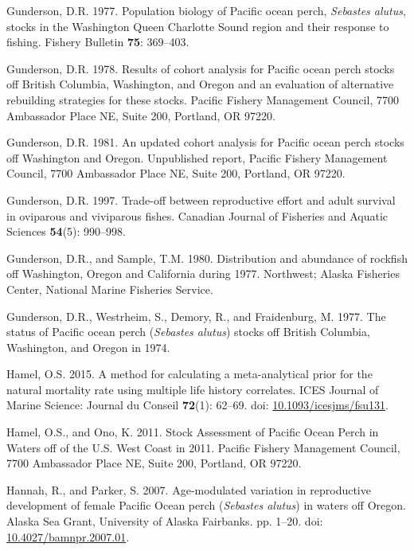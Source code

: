 \documentclass[12pt,]{article}
\begin{document}
\hypertarget{ref-gunderson_population_1977}{}
Gunderson, D.R. 1977. Population biology of Pacific ocean perch,
\emph{Sebastes alutus}, stocks in the Washington Queen Charlotte Sound
region and their response to fishing. Fishery Bulletin \textbf{75}:
369--403.

\hypertarget{ref-gunderson_results_1978}{}
Gunderson, D.R. 1978. Results of cohort analysis for Pacific ocean perch
stocks off British Columbia, Washington, and Oregon and an evaluation of
alternative rebuilding strategies for these stocks. Pacific Fishery
Management Council, 7700 Ambassador Place NE, Suite 200, Portland, OR
97220.

\hypertarget{ref-gunderson_updated_1981}{}
Gunderson, D.R. 1981. An updated cohort analysis for Pacific ocean perch
stocks off Washington and Oregon. Unpublished report, Pacific Fishery
Management Council, 7700 Ambassador Place NE, Suite 200, Portland, OR
97220.

\hypertarget{ref-gunderson_trade-off_1997}{}
Gunderson, D.R. 1997. Trade-off between reproductive effort and adult
survival in oviparous and viviparous fishes. Canadian Journal of
Fisheries and Aquatic Sciences \textbf{54}(5): 990--998.

\hypertarget{ref-gunderson_distribution_1980}{}
Gunderson, D.R., and Sample, T.M. 1980. Distribution and abundance of
rockfish off Washington, Oregon and California during 1977. Northwest;
Alaska Fisheries Center, National Marine Fisheries Service.

\hypertarget{ref-gunderson_status_1977}{}
Gunderson, D.R., Westrheim, S., Demory, R., and Fraidenburg, M. 1977.
The status of Pacific ocean perch (\emph{Sebastes alutus}) stocks off
British Columbia, Washington, and Oregon in 1974.

\hypertarget{ref-hamel_method_2015}{}
Hamel, O.S. 2015. A method for calculating a meta-analytical prior for
the natural mortality rate using multiple life history correlates. ICES
Journal of Marine Science: Journal du Conseil \textbf{72}(1): 62--69.
doi:
\href{https://doi.org/10.1093/icesjms/fsu131}{10.1093/icesjms/fsu131}.

\hypertarget{ref-hamel_stock_2011}{}
Hamel, O.S., and Ono, K. 2011. Stock Assessment of Pacific Ocean Perch
in Waters off of the U.S. West Coast in 2011. Pacific Fishery Management
Council, 7700 Ambassador Place NE, Suite 200, Portland, OR 97220.

\hypertarget{ref-hannah_age-modulated_2007}{}
Hannah, R., and Parker, S. 2007. Age-modulated variation in reproductive
development of female Pacific Ocean perch (\emph{Sebastes alutus}) in
waters off Oregon. Alaska Sea Grant, University of Alaska Fairbanks. pp.
1--20. doi:
\href{https://doi.org/10.4027/bamnpr.2007.01}{10.4027/bamnpr.2007.01}.
\end{document}
